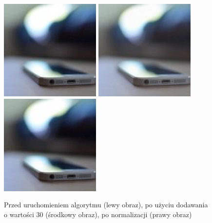 \documentclass[a4paper,12pt]{book}
\begin{document}
\begin{figure}[H]
\caption{Przed uruchomieniem algorytmu (lewy obraz), po użyciu dodawania o wartości 30 (środkowy obraz), po normalizacji (prawy obraz)}
\includegraphics[width=5cm, height=5cm]{phone-unmodified.jpg}
\includegraphics[width=5cm, height=5cm]{3-1/sum-color-const-phone-30.png}
\includegraphics[width=5cm, height=5cm]{3-1/sum-color-const-phone-30-norm.png}
\end{figure}
\end{document}
